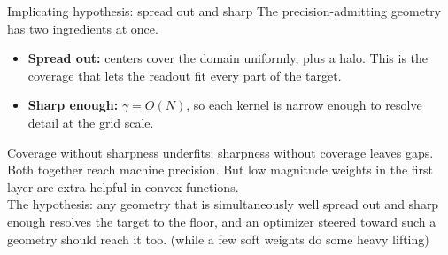 \documentclass[aspectratio=169,10pt]{beamer}
\begin{document}
\begin{frame}{Implicating hypothesis: spread out and sharp}
  The precision-admitting geometry has two ingredients at once.
  \begin{itemize}
    \item \textbf{Spread out:} centers cover the domain uniformly, plus a halo. This is the coverage that lets the readout fit every part of the target.
    \item \textbf{Sharp enough:} $\gamma=O(N)$, so each kernel is narrow enough to resolve detail at the grid scale.
  \end{itemize}
  \vspace{0.3em}
  Coverage without sharpness underfits; sharpness without coverage leaves gaps. Both together reach machine precision. But low magnitude weights in the first layer are extra helpful in convex functions. \\
  \vspace{0.3em}
  The hypothesis: any geometry that is simultaneously well spread out and sharp enough resolves the target to the floor, and an optimizer steered toward such a geometry should reach it too. (while a few soft weights do some heavy lifting)
\end{frame}
\end{document}

